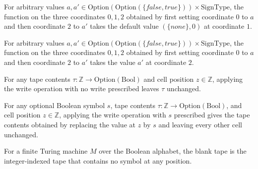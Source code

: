 \begin{theorem}
\label{Complexity.Meyer.two_02_1}
\leanok
{}
For arbitrary values $a,a' \in \mathrm{Option}(\mathrm{Option}(\{false,true\}))\times \mathrm{SignType}$, the
function on the three coordinates $0,1,2$ obtained by first setting coordinate $0$ to
$a$ and then coordinate $2$ to $a'$ takes the default value $(\{none\},0)$ at coordinate
$1$.
\end{theorem}

\begin{theorem}
\label{Complexity.Meyer.two_02_2}
\leanok
{}
For arbitrary values $a,a' \in \mathrm{Option}(\mathrm{Option}(\{false,true\}))\times \mathrm{SignType}$, the
function on the three coordinates $0,1,2$ obtained by first setting coordinate $0$ to
$a$ and then coordinate $2$ to $a'$ takes the value $a'$ at coordinate $2$.
\end{theorem}

\begin{theorem}
\label{Complexity.Meyer.wr_none}
\leanok
{}
For any tape contents $\tau:\mathbb Z\to\text{Option}(\text{Bool})$ and cell position
$z\in\mathbb Z$, applying the write operation with no write prescribed leaves $\tau$
unchanged.
\end{theorem}

\begin{theorem}
\label{Complexity.Meyer.wr_some}
\leanok
{}
For any optional Boolean symbol $s$, tape contents $\tau:\mathbb
Z\to\text{Option}(\text{Bool})$, and cell position $z\in\mathbb Z$, applying the write
operation with $s$ prescribed gives the tape contents obtained by replacing the value at
$z$ by $s$ and leaving every other cell unchanged.
\end{theorem}

\begin{definition}
\label{Complexity.Meyer.bl}
\leanok
For a finite Turing machine $M$ over the Boolean alphabet, the blank tape is the
integer-indexed tape that contains no symbol at any position.
\end{definition}

